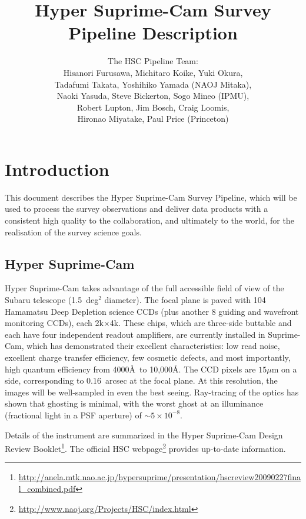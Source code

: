 \documentclass[12pt]{article}
\title{Hyper Suprime-Cam Survey \\
  Pipeline Description}
\author{
  The HSC Pipeline Team: \\
  Hisanori Furusawa,
  Michitaro Koike,
  Yuki Okura, \\
  Tadafumi Takata,
  Yoshihiko Yamada (NAOJ Mitaka), \\
  Naoki Yasuda,
  Steve Bickerton,
  Sogo Mineo (IPMU), \\
  Robert Lupton,
  Jim Bosch,
  Craig Loomis, \\
  Hironao Miyatake,
  Paul Price (Princeton) \\
}
\newcommand\x         {\hbox{$\times$}}
\begin{document}
\maketitle
\pagestyle{headings}

\begin{abstract}
\end{abstract}

\clearpage

\tableofcontents

\clearpage

\section{Introduction}

This document describes the Hyper Suprime-Cam Survey Pipeline, which will be used to process the survey
observations and deliver data products with a consistent high quality to the collaboration, and ultimately to
the world, for the realisation of the survey science goals.

\subsection{Hyper Suprime-Cam}


Hyper Suprime-Cam takes advantage of the full accessible field of view of the Subaru telescope (1.5~deg$^2$
diameter).  The focal plane is paved with 104 Hamamatsu Deep Depletion science CCDs (plus another 8 guiding
and wavefront monitoring CCDs), each 2k\x 4k. These chips, which are three-side buttable and each have four
independent readout amplifiers, are currently installed in Suprime-Cam, which has demonstrated their excellent
characteristics: low read noise, excellent charge transfer efficiency, few cosmetic defects, and most
importantly, high quantum efficiency from 4000\AA\ to 10,000\AA.  The CCD pixels are $15\mu$m on a side,
corresponding to $0.16$~arcsec at the focal plane. At this resolution, the images will be well-sampled in even
the best seeing.  Ray-tracing of the optics has shown that ghosting is minimal, with the worst ghost at an
illuminance (fractional light in a PSF aperture) of $\sim 5 \times 10^{-8}$.

Details of the instrument are summarized in the Hyper Suprime-Cam
Design Review
Booklet\footnote{\url{http://anela.mtk.nao.ac.jp/hypersuprime/presentation/hscreview20090227final_combined.pdf}}. The
official HSC
webpage\footnote{\url{http://www.naoj.org/Projects/HSC/index.html}}
provides up-to-date information.
\end{document}
